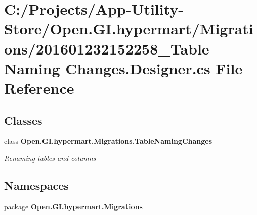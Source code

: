 \section{C\+:/\+Projects/\+App-\/\+Utility-\/\+Store/\+Open.G\+I.\+hypermart/\+Migrations/201601232152258\+\_\+\+Table Naming Changes.\+Designer.\+cs File Reference}
\label{201601232152258___table_01_naming_01_changes_8_designer_8cs}
\subsection*{Classes}
\begin{DoxyCompactItemize}
\item 
class {\bf Open.\+G\+I.\+hypermart.\+Migrations.\+Table\+Naming\+Changes}
\begin{DoxyCompactList}\small\item\em Renaming tables and columns \end{DoxyCompactList}\end{DoxyCompactItemize}
\subsection*{Namespaces}
\begin{DoxyCompactItemize}
\item 
package {\bf Open.\+G\+I.\+hypermart.\+Migrations}
\end{DoxyCompactItemize}
